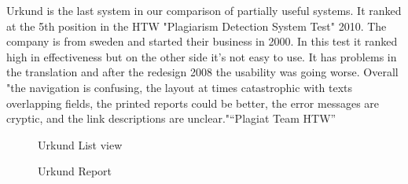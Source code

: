 Urkund is the last system in our comparison of partially useful systems. It ranked at the 5th position in the HTW "Plagiarism Detection System Test" 2010. The company is from sweden and started their business in 2000. In this test it ranked high in effectiveness but on the other side it's not easy to use. It has problems in the translation and after the redesign 2008 the usability was going worse.
Overall "the navigation is confusing, the layout at times catastrophic with texts overlapping fields,  the printed reports could be better, the error messages are cryptic, and the link descriptions are unclear."\enquote{Plagiat Team HTW}\citep{Plagiat Team HTW}


 \begin{figure}[!h]
  \centering
  \caption{Urkund List view}
  \label{fig:Urkund_list_view}
\end{figure}

 \begin{figure}[!h]
  \centering
  \caption{Urkund Report}
  \label{fig:urkund_report}
\end{figure}

